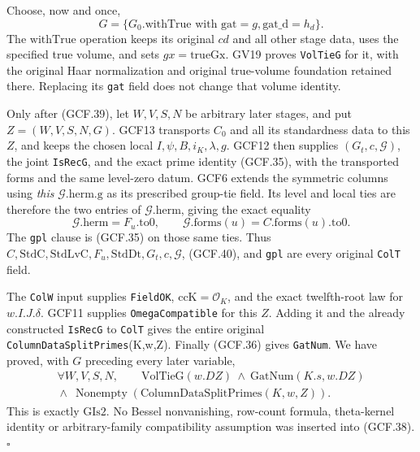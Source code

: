 Choose, now and once,
\[
         G=\{G_0.\mathrm{withTrue}
                        \text{ with }\mathrm{gat}=g,
                                      \mathrm{gat\_d}=h_d\}.
 \tag{GCF.39}
\]
The \(\mathrm{withTrue}\) operation keeps its original \(cd\)
and all other stage data, uses the specified true volume, and sets
\(gx=\mathrm{trueGx}\).  GV19 proves \texttt{VolTieG} for it,
with the original Haar normalization and original true-volume
foundation retained there.  Replacing its \texttt{gat} field does
not change that volume identity.

Only after (GCF.39), let \(W,V,S,N\) be arbitrary later stages,
and put \(Z=(W,V,S,N,G)\).  GCF13 transports \(C_0\) and all its
standardness data to this \(Z\), and keeps the chosen local
\(I,\psi,B,i_K,\lambda,g\).  GCF12 then supplies
\((G_t,c,\mathcal G)\), the joint \texttt{IsRecG}, and the exact
prime identity (GCF.35), with the transported forms and the same
level-zero datum.  GCF6 extends the symmetric columns using
\emph{this} \(\mathcal G.\mathrm{herm.g}\) as its prescribed
group-tie field.  Its level and local ties are therefore the two
entries of \(\mathcal G.\mathrm{herm}\), giving the exact equality
\[
 \mathcal G.\mathrm{herm}=F_u.\mathrm{to0},\qquad
 \mathcal G.\mathrm{forms}(u)=C.\mathrm{forms}(u).\mathrm{to0}.
 \tag{GCF.40}
\]
The \texttt{gpl} clause is (GCF.35) on those same ties.  Thus
\(C,\mathrm{StdC},\mathrm{StdLvC},F_u,\mathrm{StdDt},G_t,c,
\mathcal G\), (GCF.40), and \texttt{gpl} are every original
\texttt{ColT} field.

The \texttt{ColW} input supplies \texttt{FieldOK},
\(\mathrm{ccK}=\mathcal O_K\), and the exact twelfth-root law for
\(w.I.J.\delta\).  GCF11 supplies \texttt{OmegaCompatible} for
this \(Z\).  Adding it and the already constructed \texttt{IsRecG}
to \texttt{ColT} gives the entire original
\texttt{ColumnDataSplitPrimes}(K,w,Z).  Finally (GCF.36) gives
\texttt{GatNum}.  We have proved, with \(G\) preceding every
later variable,
\[
 \begin{gathered}
 \forall W,V,S,N,\qquad
       \mathrm{VolTieG}(w.DZ)\ \land\ \mathrm{GatNum}(K.s,w.DZ)\\
       {}\land\ \operatorname{Nonempty}
                  (\mathrm{ColumnDataSplitPrimes}(K,w,Z)).
 \end{gathered}                                                   \tag{GCF.41}
\]
This is exactly \(\mathrm{GIs2}\).  No Bessel nonvanishing,
row-count formula, theta-kernel identity or arbitrary-family
compatibility assumption was inserted into (GCF.38).
\hfill\(\square\)

